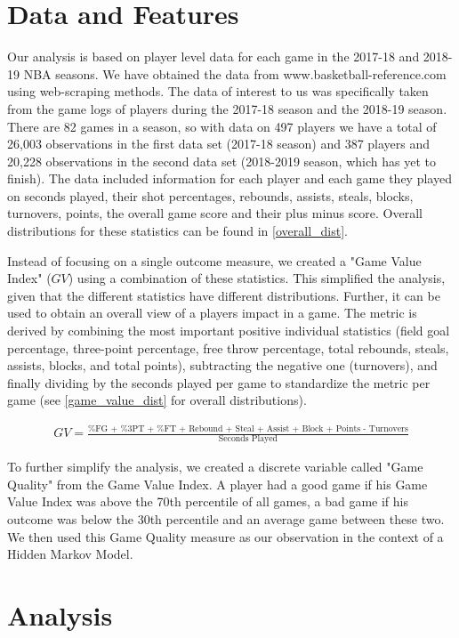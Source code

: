 \documentclass[12pt, authoryear]{elsarticle}
\begin{document}
\section{Data and Features}

Our analysis is based on player level data for each game in the 2017-18 and 2018-19 NBA seasons. We have obtained the data from www.basketball-reference.com using web-scraping methods. The data of interest to us was specifically taken from the game logs of players during the 2017-18 season and the 2018-19 season. There are 82 games in a season, so with data on 497 players we have a total of 26,003 observations in the first data set (2017-18 season) and 387 players and 20,228 observations in the second data set (2018-2019 season, which has yet to finish). The data included information for each player and each game they played on seconds played, their shot percentages, rebounds, assists, steals, blocks, turnovers, points, the overall game score and their plus minus score. Overall distributions for these statistics can be found in \ref{overall_dist}.

Instead of focusing on a single outcome measure, we created a "Game Value Index" ($GV$) using a combination of these statistics. This simplified the analysis, given that the different statistics have different distributions. Further, it can be used to obtain an overall view of a players impact in a game. The metric is derived by combining the most important positive individual statistics (field goal percentage, three-point percentage, free throw percentage, total rebounds, steals, assists, blocks, and total points), subtracting the negative one (turnovers), and finally dividing by the seconds played per game to standardize the metric per game (see \ref{game_value_dist} for overall distributions).

\begin{align*}
GV = \frac{\text{\%FG + \%3PT + \%FT + Rebound + Steal + Assist +  Block + Points - Turnovers}}{\text{Seconds Played}}
\end{align*} 

To further simplify the analysis, we created a discrete variable called "Game Quality" from the Game Value Index. A player had a good game if his Game Value Index was above the 70th percentile of all games, a bad game if his outcome was below the 30th percentile and an average game between these two. We then used this Game Quality measure as our observation in the context of a Hidden Markov Model.

\section{Analysis}
\end{document}
